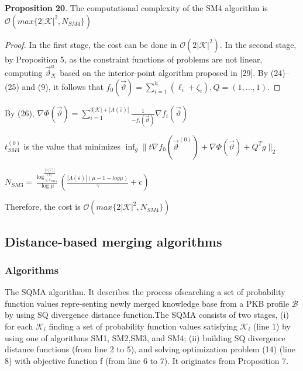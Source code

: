 \documentclass[]{iosart2c}
\begin{document}
  \textbf{Proposition 20}. The computational complexity of the
  SM4 algorithm is $\mathcal{O}(max\{2|\mathcal{K}|^2,N_{SM4}\})$

  \begin{proof}
    In the first stage, the cost can be done in
    $\mathcal{O}(2 |\mathcal{K}|^2)$. In the second stage, by Proposition 5, as
    the constraint functions of problems are not linear,
    computing $\vec{\vartheta}^u_\mathcal{K}$
    based on the interior-point algorithm
    proposed in [29]. By (24)–(25) and (9), it follows that
    $f_0\left(\vec{\vartheta}\right) = \sum^h_{i=1}(\ell_i + \zeta_i),Q = (1, ... , 1)$.
  \end{proof}

  By (26), $\nabla \Phi \left( \vec{\vartheta} \right) = \sum^{3|\mathcal{K}|+|\Lambda(\hat{\varepsilon})|}_{i=1} \frac{1}{-f_i\left(\vec{\vartheta}\right)} \nabla f_i \left( \vec{\vartheta} \right)$

  $t^{(0)}_{SM4}$ is the value that minimizes
  $\inf_g \parallel t\nabla f_0 \left( \vec{\vartheta}^(0) \right) + \nabla \Phi \left( \vec{\vartheta} \right) + Q^T g \parallel_2$

  $N_{SM3} = \frac{\log^{\frac{|\Lambda(\hat{\varepsilon})|}{(0)}}_{\in t_{SM4}}}{\log\mu} \left( \frac{ |\Lambda(\hat{\varepsilon})| (\mu - 1 - log\mu)}{\gamma} + c\right)$

  Therefore, the cost is $\mathcal{O}(max\{2 |\mathcal{K}|^2 ,N_{SM4}\})$

  \subsection{Distance-based merging algorithms}

  \subsubsection{Algorithms}

  The SQMA algorithm. It describes the process ofsearching a set of probability function values repre-senting newly merged knowledge base from a PKB
  profile $\mathcal{B}$ by using SQ divergence distance function.The SQMA consists of two stages, (i) for each $\mathcal{K}_i$
  finding a set of probability function values satisfying $\mathcal{K}_i$ (line 1) by using one of algorithms SM1, SM2,SM3, and SM4; (ii) building SQ divergence distance
  functions (from line 2 to 5), and solving optimization problem (14) (line 8) with objective function f (from line 6 to 7). It originates from Proposition 7.
\end{document}
